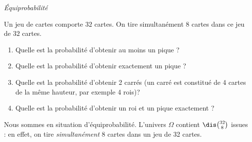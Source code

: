 \documentclass[a4paper,10pt]{report}
\begin{document}
\begin{center}
\textit{{ {\large Équiprobabilité}}}
\end{center}

\medskip



\begin{Exa} Un jeu de cartes comporte $32$ cartes. On tire simultanément $8$ cartes dans ce jeu de $32$ cartes. 

\begin{enumerate}
\item Quelle est la probabilité d'obtenir au moins un pique ?
\item Quelle est la probabilité d'obtenir exactement un pique ?
\item Quelle est la probabilité d'obtenir 2 carrés (un carré est constitué de 4 cartes de la même hauteur, par exemple 4 rois)?
\item Quelle est la probabilité d'obtenir un roi et un pique exactement ?
\end{enumerate}
\end{Exa} 

\corr Nous sommes en situation d'équiprobabilité. L'univers $\Omega$ contient $\dis \binom{32}{8}$ issues : en effet, on tire \textit{simultanément} 8 cartes dans un jeu de 32 cartes.
\end{document}
